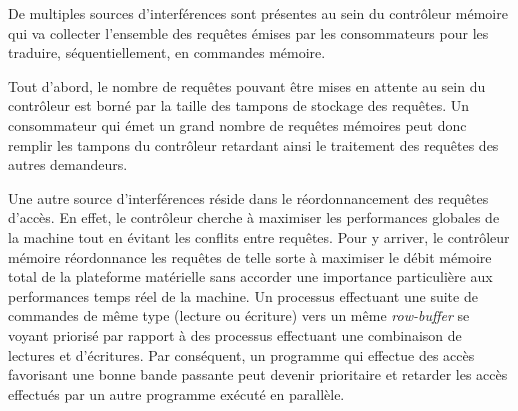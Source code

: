 



            De multiples sources d'interférences sont présentes au sein du contrôleur mémoire qui va collecter l'ensemble des requêtes émises par les consommateurs pour les traduire, séquentiellement, en commandes mémoire.

            Tout d'abord, le nombre de requêtes pouvant être mises en attente au sein du contrôleur est borné par la taille des tampons de stockage des requêtes. Un consommateur qui émet un grand nombre de requêtes mémoires peut donc remplir les tampons du contrôleur retardant ainsi le traitement des requêtes des autres demandeurs.

            Une autre source d'interférences réside dans le réordonnancement des requêtes d'accès.
            En effet, le contrôleur cherche à maximiser les performances globales de la machine tout en évitant les conflits entre requêtes.
            Pour y arriver, le contrôleur mémoire réordonnance les requêtes de telle sorte à maximiser le débit mémoire total de la plateforme matérielle sans accorder une importance particulière aux performances temps réel de la machine. Un processus effectuant une suite de commandes de même type (lecture ou écriture) vers un même \emph{row-buffer} se voyant priorisé par rapport à des processus effectuant une combinaison de lectures et d'écritures.
            Par conséquent, un programme qui effectue des accès favorisant une bonne bande passante peut devenir prioritaire et retarder les accès effectués par un autre programme exécuté en parallèle.

